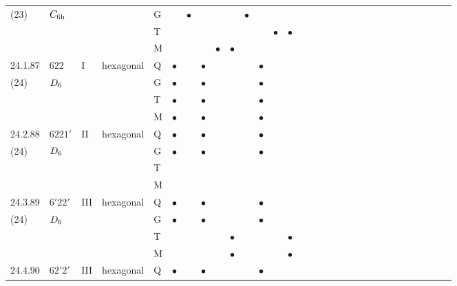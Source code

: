 \documentclass[fleqn,9pt,landscape]{jsarticle}
\begin{document}
\begin{longtable}{lllll|l|l|l|l|l|l|l|l|l|ll|ll|ll|ll|ll|ll|ll|ll}
(23) & $C_{\rm 6h}$ &  &  & G &  & $\bullet$ &  &  &  & $\bullet$ &  &  &  &  &  &  &  &  &  &  &  &  &  &  &  &  &  &  &  \\
 &  &  &  & T &  &  &  &  &  &  &  & $\bullet$ & $\bullet$ &  &  &  &  &  &  &  &  &  &  &  &  &  &  &  &  \\
 &  &  &  & M &  &  &  & $\bullet$ & $\bullet$ &  &  &  &  &  &  &  &  &  &  &  &  &  &  &  &  &  &  &  &  \\ \hline
24.1.87 & \texttt{$622$} & I & hexagonal & Q & $\bullet$ &  & $\bullet$ &  &  &  & $\bullet$ &  &  &  &  &  &  &  &  &  &  &  &  &  &  &  &  &  &  \\
(24) & $D_{\rm 6}$ &  &  & G & $\bullet$ &  & $\bullet$ &  &  &  & $\bullet$ &  &  &  &  &  &  &  &  &  &  &  &  &  &  &  &  &  &  \\
 &  &  &  & T & $\bullet$ &  & $\bullet$ &  &  &  & $\bullet$ &  &  &  &  &  &  &  &  &  &  &  &  &  &  &  &  &  &  \\
 &  &  &  & M & $\bullet$ &  & $\bullet$ &  &  &  & $\bullet$ &  &  &  &  &  &  &  &  &  &  &  &  &  &  &  &  &  &  \\ \hline
24.2.88 & \texttt{$6221'$} & II & hexagonal & Q & $\bullet$ &  & $\bullet$ &  &  &  & $\bullet$ &  &  &  &  &  &  &  &  &  &  &  &  &  &  &  &  &  &  \\
(24) & $D_{\rm 6}$ &  &  & G & $\bullet$ &  & $\bullet$ &  &  &  & $\bullet$ &  &  &  &  &  &  &  &  &  &  &  &  &  &  &  &  &  &  \\
 &  &  &  & T &  &  &  &  &  &  &  &  &  &  &  &  &  &  &  &  &  &  &  &  &  &  &  &  &  \\
 &  &  &  & M &  &  &  &  &  &  &  &  &  &  &  &  &  &  &  &  &  &  &  &  &  &  &  &  &  \\ \hline
24.3.89 & \texttt{$6'22'$} & III & hexagonal & Q & $\bullet$ &  & $\bullet$ &  &  &  & $\bullet$ &  &  &  &  &  &  &  &  &  &  &  &  &  &  &  &  &  &  \\
(24) & $D_{\rm 6}$ &  &  & G & $\bullet$ &  & $\bullet$ &  &  &  & $\bullet$ &  &  &  &  &  &  &  &  &  &  &  &  &  &  &  &  &  &  \\
 &  &  &  & T &  &  &  &  & $\bullet$ &  &  &  & $\bullet$ &  &  &  &  &  &  &  &  &  &  &  &  &  &  &  &  \\
 &  &  &  & M &  &  &  &  & $\bullet$ &  &  &  & $\bullet$ &  &  &  &  &  &  &  &  &  &  &  &  &  &  &  &  \\ \hline
24.4.90 & \texttt{$62'2'$} & III & hexagonal & Q & $\bullet$ &  & $\bullet$ &  &  &  & $\bullet$ &  &  &  &  &  &  &  &  &  &  &  &  &  &  &  &  &  &  \\

\end{longtable}
\end{document}

